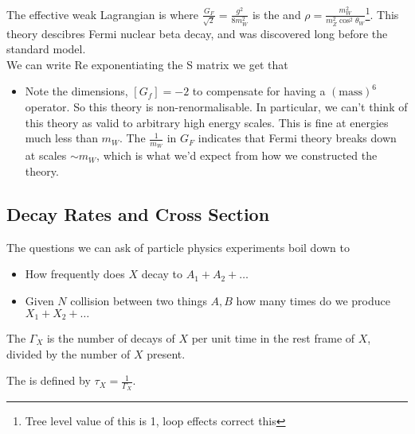 \documentclass{article}
\begin{document}
The effective weak Lagrangian is 
where $\frac{G_F}{\sqrt{2}} = \frac{g^2}{8m_W^2}$ is the  and $\rho = \frac{m_W^2}{m_Z^2 \cos^2 \theta_W}$\footnote{Tree level value of this is 1, loop effects correct this}. This theory descibres Fermi nuclear beta decay, and was discovered long before the standard model. \\

We can write 
Re exponentiating the S matrix we get that 
\begin{itemize}
    \item Note the dimensions, $[G_f]=-2$ to compensate for having a $(\text{mass})^6$ operator. So this theory is non-renormalisable. In particular, we can't think of this theory as valid to arbitrary high energy scales. This is fine at energies much less than $m_W$. The $\frac{1}{m_W}$ in $G_F$ indicates that Fermi theory breaks down at scales $\sim m_W$, which is what we'd expect from how we constructed the theory.  
\end{itemize}

\subsection{Decay Rates and Cross Section}
The questions we can ask of particle physics experiments boil down to  
\begin{itemize}
    \item How frequently does $X$ decay to $A_1 + A_2 + \dots$
    \item Given $N$ collision between two things $A,B$ how many times do we produce $X_1 + X_2 + \dots$
\end{itemize}

\begin{definition}
The  $\Gamma_X$ is the number of decays of $X$ per unit time in the rest frame of $X$, divided by the number of $X$ present. 
\end{definition}

\begin{definition}[Lifetime]
The  is defined by $\tau_X = \frac{1}{\Gamma_X}$. 
\end{definition}
\end{document}

